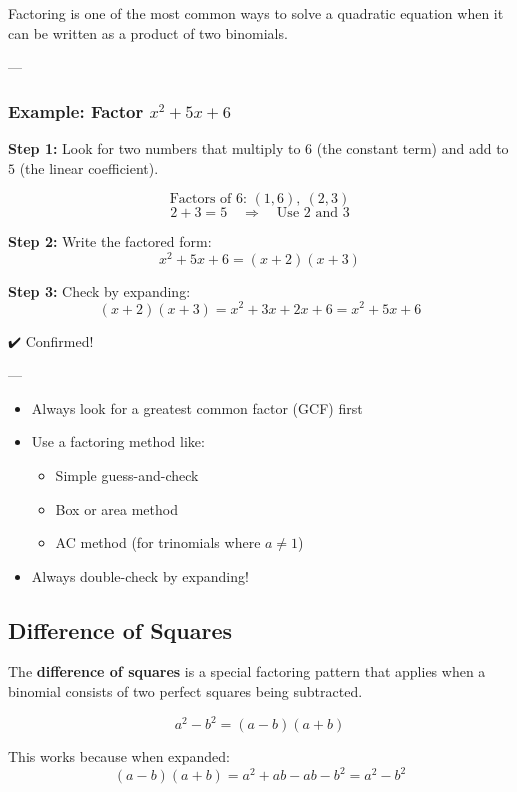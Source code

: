 \documentclass[11pt]{article}
\begin{document}
Factoring is one of the most common ways to solve a quadratic equation when it can be written as a product of two binomials.

---

\subsubsection*{Example: Factor \( x^2 + 5x + 6 \)}

\textbf{Step 1:} Look for two numbers that multiply to \( 6 \) (the constant term) and add to \( 5 \) (the linear coefficient).

\[
\text{Factors of 6: } (1,6),\ (2,3)
\]
\[
2 + 3 = 5 \quad \Rightarrow \quad \text{Use } 2 \text{ and } 3
\]

\textbf{Step 2:} Write the factored form:
\[
x^2 + 5x + 6 = (x + 2)(x + 3)
\]

\textbf{Step 3:} Check by expanding:
\[
(x + 2)(x + 3) = x^2 + 3x + 2x + 6 = x^2 + 5x + 6
\]

✔️ Confirmed!

---

\begin{tcolorbox}[title=Factoring Tips, colback=green!5!white, colframe=green!70!black]
\begin{itemize}
  \item Always look for a greatest common factor (GCF) first
  \item Use a factoring method like:
  \begin{itemize}
    \item Simple guess-and-check
    \item Box or area method
    \item AC method (for trinomials where \( a \ne 1 \))
  \end{itemize}
  \item Always double-check by expanding!
\end{itemize}
\end{tcolorbox}
\subsection{Difference of Squares}

The \textbf{difference of squares} is a special factoring pattern that applies when a binomial consists of two perfect squares being subtracted.

\[
a^2 - b^2 = (a - b)(a + b)
\]

This works because when expanded:
\[
(a - b)(a + b) = a^2 + ab - ab - b^2 = a^2 - b^2
\]
\end{document}
